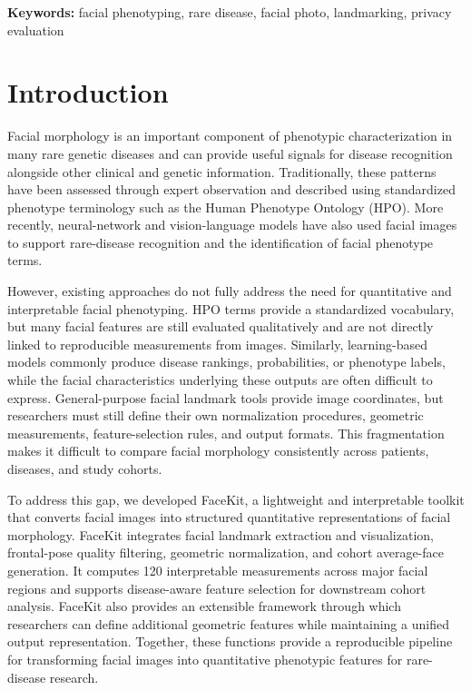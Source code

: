 \documentclass[11pt]{article}
\begin{document}
\noindent\textbf{Keywords:} facial phenotyping, rare disease, facial photo, landmarking, privacy evaluation

\section{Introduction}
Facial morphology is an important component of phenotypic characterization in many rare genetic diseases and can provide useful signals for disease recognition alongside other clinical and genetic information. Traditionally, these patterns have been assessed through expert observation and described using standardized phenotype terminology such as the Human Phenotype Ontology (HPO). More recently, neural-network \cite{DeepGestalt,hsieh2022gestaltmatcher} and vision-language models \cite{mint, gestaltmml} have also used facial images to support rare-disease recognition and the identification of facial phenotype terms.

However, existing approaches do not fully address the need for quantitative and interpretable facial phenotyping. HPO terms provide a standardized vocabulary, but many facial features are still evaluated qualitatively and are not directly linked to reproducible measurements from images. Similarly, learning-based models commonly produce disease rankings, probabilities, or phenotype labels, while the facial characteristics underlying these outputs are often difficult to express. General-purpose facial landmark tools provide image coordinates, but researchers must still define their own normalization procedures, geometric measurements, feature-selection rules, and output formats. This fragmentation makes it difficult to compare facial morphology consistently across patients, diseases, and study cohorts.

To address this gap, we developed FaceKit, a lightweight and interpretable toolkit that converts facial images into structured quantitative representations of facial morphology. FaceKit integrates facial landmark extraction and visualization, frontal-pose quality filtering, geometric normalization, and cohort average-face generation. It computes 120 interpretable measurements across major facial regions and supports disease-aware feature selection for downstream cohort analysis. FaceKit also provides an extensible framework through which researchers can define additional geometric features while maintaining a unified output representation. Together, these functions provide a reproducible pipeline for transforming facial images into quantitative phenotypic features for rare-disease research.
\end{document}
